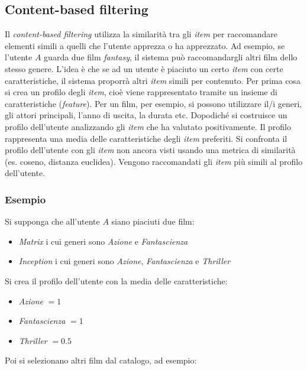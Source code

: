 \subsection{Content-based filtering}
Il \textit{content-based filtering} utilizza la similarità tra gli \textit{item} per raccomandare elementi simili a quelli che l'utente apprezza o ha apprezzato. Ad esempio, se l'utente $A$ guarda due film \textit{fantasy}, il sistema può raccomandargli altri film dello stesso genere. L'idea è che se ad un utente è piaciuto un certo \textit{item} con certe caratteristiche, il sistema proporrà altri \textit{item} simili per contenuto. Per prima cosa si crea un profilo degli \textit{item}, cioè viene rappresentato tramite un insieme di caratteristiche (\textit{feature}). Per un film, per esempio, si possono utilizzare il/i generi, gli attori principali, l'anno di uscita, la durata etc. Dopodiché si costruisce un profilo dell'utente analizzando gli \textit{item} che ha valutato positivamente. Il profilo rappresenta una media delle caratteristiche degli \textit{item} preferiti. Si confronta il profilo dell'utente con gli \textit{item} non ancora visti usando una metrica di similarità (es. coseno, distanza euclidea). Vengono raccomandati gli \textit{item} più simili al profilo dell'utente.

\subsubsection{Esempio}

Si supponga che all'utente $A$ siano piaciuti due film:

\begin{itemize}
    \item \textit{Matrix} i cui generi sono \textit{Azione} e \textit{Fantascienza}
    \item \textit{Inception} i cui generi sono \textit{Azione}, \textit{Fantascienza} e \textit{Thriller}
\end{itemize}

Si crea il profilo dell'utente con la media delle caratteristiche: 

\begin{itemize}
    \item \textit{Azione} $= 1$
    \item \textit{Fantascienza} $= 1$
    \item \textit{Thriller} $= 0.5$
\end{itemize}

Poi si selezionano altri film dal catalogo, ad esempio:

